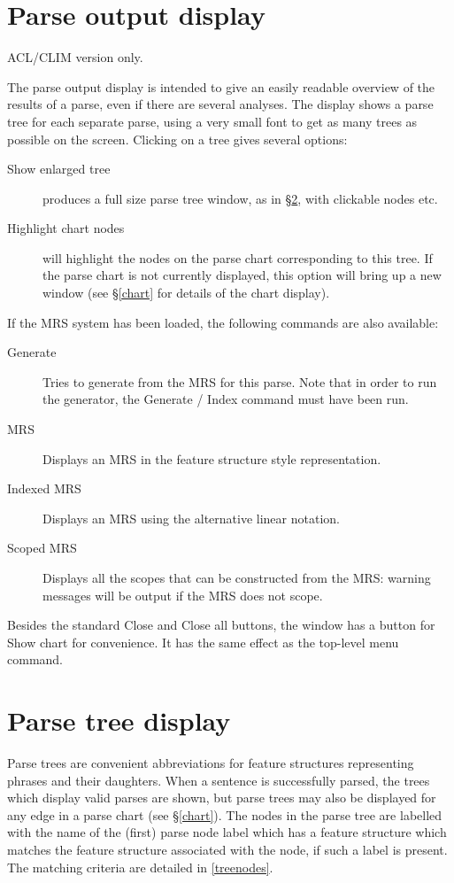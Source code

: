 \documentclass[12pt]{report}
\newcommand{\lkbmenucommand}{{\bf}}
\begin{document}
\section{Parse output display}
\label{parseout}

ACL/CLIM version only.

The parse output display is intended to give an easily readable
overview of the results of a parse, even if there are several
analyses.  The display shows a parse tree for each separate
parse, using a very small font to get as many trees as possible on
the screen.  Clicking on a tree gives several options:
\begin{description}
\item[Show enlarged tree] produces a full size parse tree window, as
in \S\ref{parsetree}, with clickable nodes etc.
\item[Highlight chart nodes] will highlight the nodes on the 
parse chart corresponding to this tree.  If the parse chart is not currently
displayed, this option will bring up a new window (see \S\ref{chart}
for details of the chart display).
\end{description}
If the MRS system has been loaded, the following commands are also available:
\begin{description}
\item[Generate] Tries to generate from the MRS for this parse.  Note that
in order to run the generator, the {\lkbmenucommand Generate} / {\lkbmenucommand Index}
command must have been run.
\item[MRS] Displays an MRS in the feature structure style representation.
\item[Indexed MRS] Displays an MRS using the alternative linear notation. 
\item[Scoped MRS] Displays all the scopes that can be constructed from the MRS:
warning messages will be output if the MRS does not scope.
\end{description}


Besides the standard {\lkbmenucommand Close} and {\lkbmenucommand Close all} buttons,
the window has a button for {\lkbmenucommand Show chart} for convenience.
It has the same effect as the top-level menu command.


\section{Parse tree display}
\label{parsetree}

Parse trees are convenient abbreviations for feature structures 
representing phrases and their
daughters.  When a sentence is successfully
parsed, the trees which display valid
parses are shown, but parse trees may also be displayed for any edge in 
a parse chart (see \S\ref{chart}).
The nodes in the parse tree are labelled with the name of the 
(first) parse node label which has a feature structure which matches 
the feature structure associated with the node, if such a label 
is present.  The matching criteria are detailed in \ref{treenodes}.  
\end{document}

